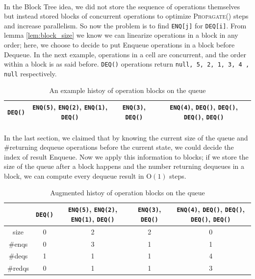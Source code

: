 \documentclass[10pt]{article}
\theoremstyle{definition}
\begin{document}
\paragraph{}
In the Block Tree idea, we did not store the sequence of operations themselves but instead stored blocks of concurrent operations to optimize \textsc{Propagate()} steps and increase parallelism. So now the problem is to find \texttt{ENQ[j]} for \texttt{DEQ[i]}. From lemma \ref{lem:block_size} we know we can linearize operations in a block in any order; here, we choose to decide to put Enqueue operations in a block before Dequeue. In the next example, operations in a cell are concurrent, and the order within a block is as said before. \texttt{DEQ()} operations return \texttt{null, 5, 2, 1, 3, 4 , null} respectively.

\begin{table}[hbt]
\centering
  \begin{tabular}{c|c|c|c}
    \hline \texttt{DEQ()} & \texttt{ENQ(5)}, \texttt{ENQ(2)}, \texttt{ENQ(1)}, \texttt{DEQ()}& \texttt{ENQ(3)}, \texttt{DEQ()}&  \texttt{ENQ(4)}, \texttt{DEQ()}, \texttt{DEQ()}, \texttt{DEQ()}, \texttt{DEQ()}\\ \hline
  \end{tabular}
  \caption{An example histoy of operation blocks on the queue}
\end{table}

\paragraph{}
In the last section, we claimed that by knowing the current size of the queue and $\#$returning dequeue operations before the current state, we could decide the index of result Enqueue. Now we apply this information to blocks; if we store the size of the queue after a block happens and the number returning dequeues in a block, we can compute every dequeue result in \textsc{O}$(1)$ steps.

\begin{table}[hbt]
\centering
  \begin{tabular}{c|c|c|c|c}
    \hline &\texttt{DEQ()} & \texttt{ENQ(5)}, \texttt{ENQ(2)}, \texttt{ENQ(1)}, \texttt{DEQ()}& \texttt{ENQ(3)}, \texttt{DEQ()}&  \texttt{ENQ(4)}, \texttt{DEQ()}, \texttt{DEQ()}, \texttt{DEQ()}, \texttt{DEQ()}\\ \hline
    size & 0 & 2 & 2 & 0 \\ \hline
    \#enqs & 0 & 3 & 1 & 1 \\ \hline
        \#deqs & 1 & 1 & 1 & 4 \\ \hline
            \#redqs & 0 & 1 & 1 & 3 \\ \hline
  \end{tabular}
  \caption{Augmented histoy of operation blocks on the queue}
\end{table}
\end{document}
